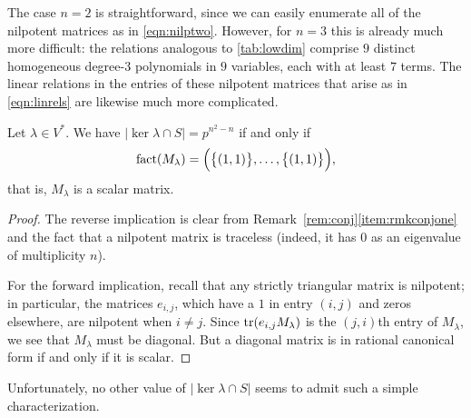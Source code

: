 \begin{rem}
The case $n=2$ is straightforward, since we can easily enumerate all of the nilpotent matrices as in \eqref{eqn:nilptwo}. However, for $n=3$ this is already much more difficult: the relations analogous to \eqref{tab:lowdim} comprise $9$ distinct homogeneous degree-$3$ polynomials in $9$ variables, each with at least $7$ terms. The linear relations in the entries of these nilpotent matrices that arise as in \eqref{eqn:linrels} are likewise much more complicated.
\end{rem}

\begin{prop}
Let $\lambda\in V^*$. We have $|\ker\lambda\cap S|=p^{n^2-n}$ if and only if
\begin{equation*}
\operatorname{fact}(M_\lambda)=\Big(\big\{(1,1)\big\},\ldots,\big\{(1,1)\big\}\Big),
\end{equation*}
that is, $M_\lambda$ is a scalar matrix.
\end{prop}
\begin{proof}
The reverse implication is clear from Remark~\ref{rem:conj}\eqref{item:rmkconjone} and the fact that a nilpotent matrix is traceless (indeed, it has $0$ as an eigenvalue of multiplicity $n$).

For the forward implication, recall that any strictly triangular matrix is nilpotent; in particular, the matrices $e_{i,j}$, which have a $1$ in entry $(i,j)$ and zeros elsewhere, are nilpotent when $i\ne j$. Since $\operatorname{tr}(e_{i,j}M_\lambda)$ is the $(j,i)$th entry of $M_\lambda$, we see that $M_\lambda$ must be diagonal. But a diagonal matrix is in rational canonical form if and only if it is scalar.
\end{proof}

Unfortunately, no other value of $|\ker\lambda\cap S|$ seems to admit such a simple characterization.

